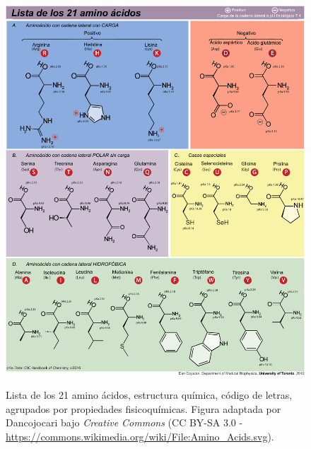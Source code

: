 \begin{appendix}
\begin{figure}[]
    \centering
	\includegraphics[width=1\linewidth, height=0.99\textheight, keepaspectratio]{fig/04_anexos/tabla_aa.pdf} 
\caption[]{Lista de los 21 amino ácidos, estructura química, código de letras, agrupados por propiedades fisicoquímicas. Figura adaptada por Dancojocari bajo \textit{Creative Commons} (CC BY-SA 3.0 - \url{https://commons.wikimedia.org/wiki/File:Amino_Acids.svg}).}
    \label{tab:tabla_aa}
\end{figure}

\end{appendix}